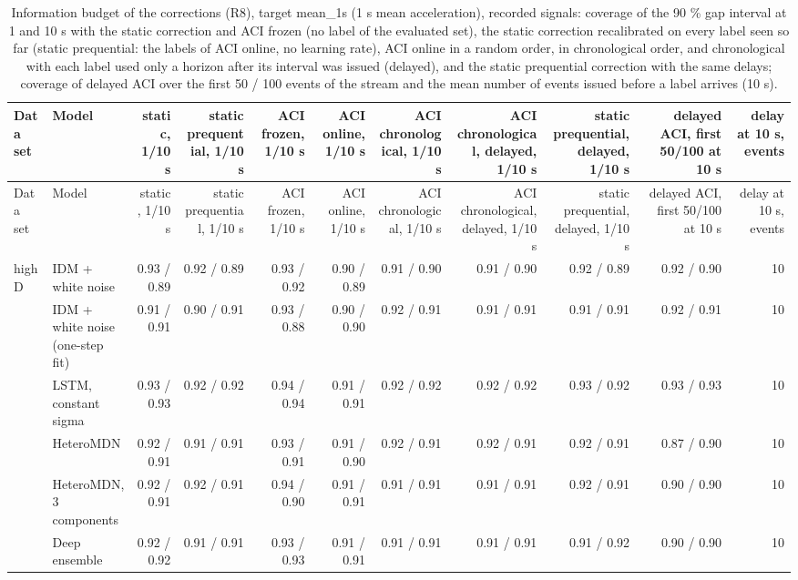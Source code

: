 \begin{longtable}{llrrrrrrrrr}
\caption{Information budget of the corrections (R8), target mean\_1s (1 s mean acceleration), recorded signals: coverage of the 90 \% gap interval at 1 and 10 s with the static correction and ACI frozen (no label of the evaluated set), the static correction recalibrated on every label seen so far (static prequential: the labels of ACI online, no learning rate), ACI online in a random order, in chronological order, and chronological with each label used only a horizon after its interval was issued (delayed), and the static prequential correction with the same delays; coverage of delayed ACI over the first 50 / 100 events of the stream and the mean number of events issued before a label arrives (10 s).}\label{tab:t4-info-budget--raw--mean-1s} \\
\toprule
Data set & Model & static, 1/10 s & static prequential, 1/10 s & ACI frozen, 1/10 s & ACI online, 1/10 s & ACI chronological, 1/10 s & ACI chronological, delayed, 1/10 s & static prequential, delayed, 1/10 s & delayed ACI, first 50/100 at 10 s & delay at 10 s, events \\
\midrule
\endfirsthead
\toprule
Data set & Model & static, 1/10 s & static prequential, 1/10 s & ACI frozen, 1/10 s & ACI online, 1/10 s & ACI chronological, 1/10 s & ACI chronological, delayed, 1/10 s & static prequential, delayed, 1/10 s & delayed ACI, first 50/100 at 10 s & delay at 10 s, events \\
\midrule
\endhead
\bottomrule
\endlastfoot
highD & IDM + white noise & 0.93 / 0.89 & 0.92 / 0.89 & 0.93 / 0.92 & 0.90 / 0.89 & 0.91 / 0.90 & 0.91 / 0.90 & 0.92 / 0.89 & 0.92 / 0.90 & 10 \\
 & IDM + white noise (one-step fit) & 0.91 / 0.91 & 0.90 / 0.91 & 0.93 / 0.88 & 0.90 / 0.90 & 0.92 / 0.91 & 0.91 / 0.91 & 0.91 / 0.91 & 0.92 / 0.91 & 10 \\
 & LSTM, constant sigma & 0.93 / 0.93 & 0.92 / 0.92 & 0.94 / 0.94 & 0.91 / 0.91 & 0.92 / 0.92 & 0.92 / 0.92 & 0.93 / 0.92 & 0.93 / 0.93 & 10 \\
 & HeteroMDN & 0.92 / 0.91 & 0.91 / 0.91 & 0.93 / 0.91 & 0.91 / 0.90 & 0.92 / 0.91 & 0.92 / 0.91 & 0.92 / 0.91 & 0.87 / 0.90 & 10 \\
 & HeteroMDN, 3 components & 0.92 / 0.91 & 0.92 / 0.91 & 0.94 / 0.90 & 0.91 / 0.91 & 0.91 / 0.91 & 0.91 / 0.91 & 0.92 / 0.91 & 0.90 / 0.90 & 10 \\
 & Deep ensemble & 0.92 / 0.92 & 0.91 / 0.91 & 0.93 / 0.93 & 0.91 / 0.91 & 0.91 / 0.91 & 0.91 / 0.91 & 0.91 / 0.92 & 0.90 / 0.90 & 10 \\

\end{longtable}
